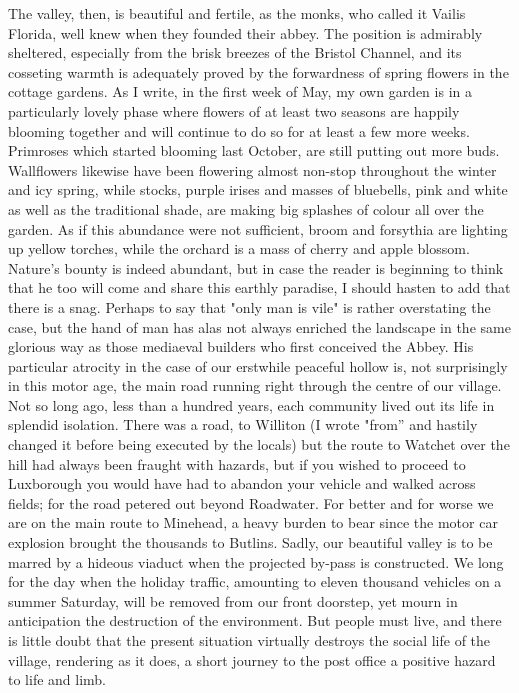The valley, then, is beautiful and fertile, as the monks, who called it Vailis Florida, well knew when they founded their abbey. The position is admirably sheltered, especially from the brisk breezes of the Bristol Channel, and its cosseting warmth is adequately proved by the forwardness of spring flowers in the cottage gardens. As I write, in the first week of May, my own garden is in a particularly lovely phase where flowers of at least two seasons are happily blooming together and will continue to do so for at least a few more weeks. Primroses which started blooming last October, are still putting out more buds. Wallflowers likewise have been flowering almost non-stop throughout the winter and icy spring, while stocks, purple irises and masses of bluebells, pink and white as well as the traditional shade, are making big splashes of colour all over the garden. As if this abundance were not sufficient, broom and forsythia are lighting up yellow torches, while the orchard is a mass of cherry and apple blossom. Nature’s bounty is indeed abundant, but in case the reader is beginning to think that he too will come and share this earthly paradise, I should hasten to add that there is a snag. Perhaps to say that "only man is vile" is rather overstating the case, but the hand of man has alas not always enriched the landscape in the same glorious way as those mediaeval builders who first conceived the Abbey. His particular atrocity in the case of our erstwhile peaceful hollow is, not surprisingly in this motor age, the main road running right through the centre of our village. Not so long ago, less than a hundred years, each community lived out its life in splendid isolation. There was a road, to Williton (I wrote "from” and hastily changed it before being executed by the locals) but the route to Watchet over the hill had always been fraught with hazards, but if you wished to proceed to Luxborough you would have had to abandon your vehicle and walked across fields; for the road petered out beyond Roadwater. For better and for worse we are on the main route to Minehead, a heavy burden to bear since the motor car explosion brought the thousands to Butlins. Sadly, our beautiful valley is to be marred by a hideous viaduct when the projected by-pass is constructed. We long for the day when the holiday traffic, amounting to eleven thousand vehicles on a summer Saturday, will be removed from our front doorstep, yet mourn in anticipation the destruction of the environment. But people must live, and there is little doubt that the present situation virtually destroys the social life of the village, rendering as it does, a short journey to the post office a positive hazard to life and limb.

